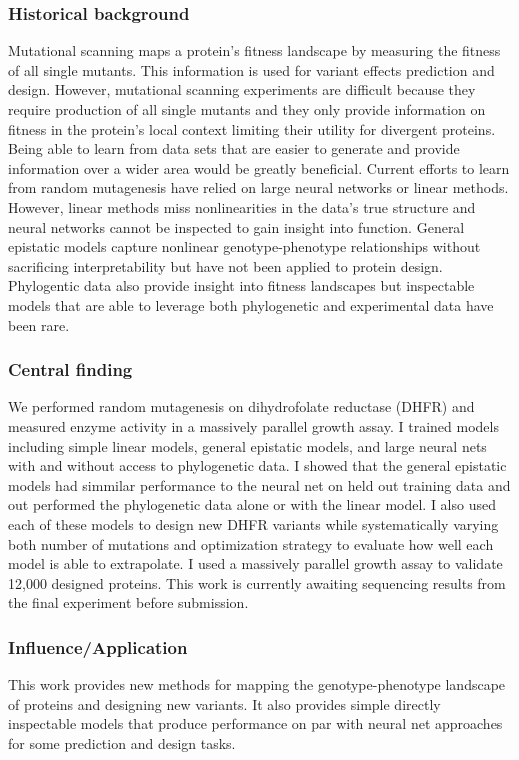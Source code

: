 \documentclass{article}
\begin{document}
\subsubsection{Historical background}
Mutational scanning maps a protein's fitness landscape by measuring the fitness of all single mutants.
This information is used for variant effects prediction and design.
However, mutational scanning experiments are difficult because they require production of all single mutants and they only provide information on fitness in the protein's local context limiting their utility for divergent proteins.
Being able to learn from data sets that are easier to generate and provide information over a wider area would be greatly beneficial.
Current efforts to learn from random mutagenesis have relied on large neural networks or linear methods.
However, linear methods miss nonlinearities in the data's true structure and neural networks cannot be inspected to gain insight into function.
General epistatic models capture nonlinear genotype-phenotype relationships without sacrificing interpretability but have not been applied to protein design.
Phylogentic data also provide insight into fitness landscapes but inspectable models that are able to leverage both phylogenetic and experimental data have been rare.
%
\subsubsection{Central finding}
We performed random mutagenesis on dihydrofolate reductase (DHFR) and measured enzyme activity in a massively parallel growth assay. 
I trained models including simple linear models, general epistatic models, and large neural nets with and without access to phylogenetic data. 
I showed that the general epistatic models had simmilar performance to the neural net on held out training data and out performed the phylogenetic data alone or with the linear model. 
I also used each of these models to design new DHFR variants while systematically varying both number of mutations and optimization strategy to evaluate how well each model is able to extrapolate.
I used a massively parallel growth assay to validate 12,000 designed proteins.
This work is currently awaiting sequencing results from the final experiment before submission.
%
\subsubsection{Influence/Application}
This work provides new methods for mapping the genotype-phenotype landscape of proteins and designing new variants.
It also provides simple directly inspectable models that produce performance on par with neural net approaches for some prediction and design tasks.
%
\end{document}
